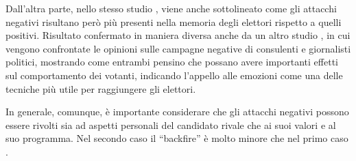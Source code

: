 Dall’altra parte, nello stesso studio \citep{fridkin2011}, viene anche sottolineato come gli attacchi negativi risultano però più presenti nella memoria degli elettori rispetto a quelli positivi. Risultato confermato in maniera diversa anche da un altro studio \citep{perloff1992}, in cui vengono confrontate le opinioni sulle campagne negative di consulenti e giornalisti politici, mostrando come entrambi pensino che possano avere importanti effetti sul comportamento dei votanti, indicando l’appello alle emozioni come una delle tecniche più utile per raggiungere gli elettori.

In generale, comunque, è importante considerare che gli attacchi negativi possono essere rivolti sia ad aspetti personali del candidato rivale che ai suoi valori e al suo programma. Nel secondo caso il “backfire” è molto minore che nel  primo caso \citep{carraro2010}.







%
%













